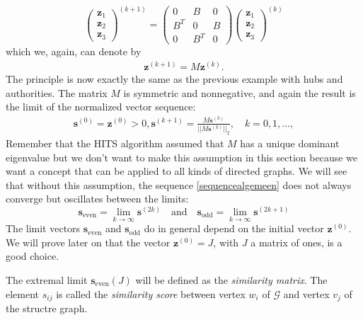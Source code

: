 \documentclass[a4paper,11pt]{report}
\newcommand{\graf}{\mathscr{G}}
\begin{document}
$$\begin{pmatrix}
\mathbf{z}_1\\
\mathbf{z}_2\\
\mathbf{z}_3
\end{pmatrix}^{(k+1)} = \begin{pmatrix}
0 & B & 0\\
B^T & 0 & B\\
0 & B^T & 0
\end{pmatrix}\begin{pmatrix}
\mathbf{z}_1\\
\mathbf{z}_2\\
\mathbf{z}_3
\end{pmatrix}^{(k)}   $$ 
which we, again, can denote by 
\begin{eqnarray}\label{kleinecompact}
 \mathbf{z}^{(k+1)} = M\mathbf{z}^{(k)}.
  \end{eqnarray}
 The principle is now exactly the 
same as the previous example with hubs and authorities. The matrix $M$ is 
symmetric and nonnegative, and again the result is the limit of the normalized vector sequence:
\begin{eqnarray}\label{sequencealgemeen}
  \mathbf{s}^{(0)} = \mathbf{z}^{(0)} > 0, \mathbf{s}^{(k+1)} = \frac{M\mathbf{s}^{(k)}}{||M\mathbf{s}^{(k)}||_2}, \quad k = 
  0,1,\ldots,
\end{eqnarray}
Remember that the HITS algorithm assumed that $M$ has a unique dominant 
eigenvalue but we don't want to make this assumption in this section because we 
want a concept that can be applied to all kinds of directed graphs. We will see 
that without this assumption, the sequence \ref{sequencealgemeen} does not 
always converge but oscillates between the limits:
$$\mathbf{s}_\text{even}= \lim_{k\to\infty}\mathbf{s}^{(2k)}\quad\text{and}\quad \mathbf{s}_{\text{odd}}= \lim_{k\to\infty}\mathbf{s}^{(2k+1)}$$ 
The limit vectors $\mathbf{s}_\text{even}$ and $\mathbf{s}_\text{odd}$ do in 
general depend on the initial vector $\mathbf{z}^{(0)}$. We will prove later on that the vector 
$\mathbf{z}^{(0)}=J$, with $J$ a matrix of ones,
is a good choice.

The  
extremal limit  $\mathbf{s}_{\text{even}}(J)$ will be defined as the \textit{similarity 
matrix}. The element $s_{ij}$ is called the \textit{similarity score}
between vertex $w_i$ of $\graf$ and vertex $v_j$ of the structre graph. 
\end{document}
